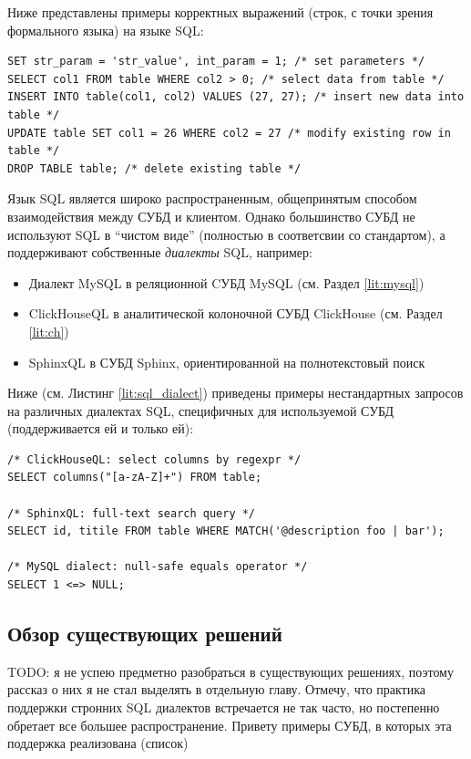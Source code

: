 Ниже представлены примеры корректных выражений (строк, с точки зрения формального языка) на языке SQL:
\begin{code}
\label{lit:sql_ex}
\begin{verbatim}
SET str_param = 'str_value', int_param = 1; /* set parameters */
SELECT col1 FROM table WHERE col2 > 0; /* select data from table */
INSERT INTO table(col1, col2) VALUES (27, 27); /* insert new data into table */
UPDATE table SET col1 = 26 WHERE col2 = 27 /* modify existing row in table */
DROP TABLE table; /* delete existing table */
\end{verbatim}
\end{code}

Язык SQL является широко распространенным, общепринятым способом взаимодействия между СУБД и клиентом. Однако большинство СУБД не используют SQL в \enquote{чистом виде} (полностью в соответсвии со стандартом), а поддерживают собственные \textit{диалекты} SQL, например:
\begin{itemize}
    \item Диалект MySQL в реляционной CУБД MySQL (см. Раздел \ref{lit:mysql})
    \item ClickHouseQL в аналитической колоночной СУБД ClickHouse (см. Раздел \ref{lit:ch})
    \item SphinxQL в СУБД Sphinx, ориентированной на полнотекстовый поиск
\end{itemize}

Ниже (см. Листинг \ref{lit:sql_dialect}) приведены примеры нестандартных запросов на различных диалектах SQL, специфичных для используемой СУБД (поддерживается ей и только ей):

\begin{code}
\label{lit:sql_dialect}
\begin{verbatim}
/* ClickHouseQL: select columns by regexpr */ 
SELECT columns("[a-zA-Z]+") FROM table;

/* SphinxQL: full-text search query */
SELECT id, titile FROM table WHERE MATCH('@description foo | bar');

/* MySQL dialect: null-safe equals operator */
SELECT 1 <=> NULL;
\end{verbatim}
\end{code}

\subsection{Обзор существующих решений}
TODO: я не успею предметно разобраться в существующих решениях, поэтому рассказ о них я не стал выделять в отдельную главу. Отмечу, что практика поддержки стронних SQL диалектов встречается не так часто, но постепенно обретает все большее распространение. Привету примеры СУБД, в которых эта поддержка реализована (список)

